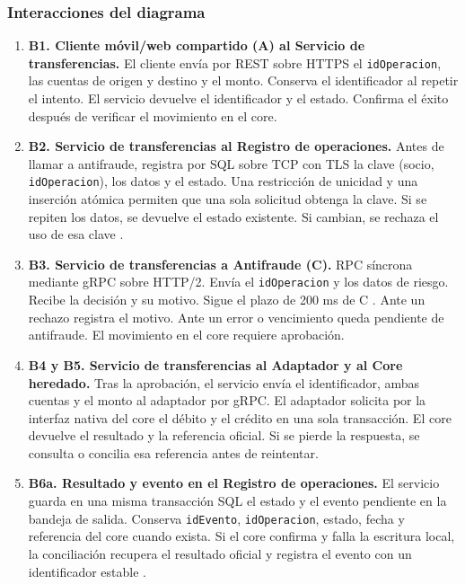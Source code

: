 \documentclass[12pt,a4paper]{article}
\begin{document}
\subsubsection{Interacciones del diagrama}

\begin{enumerate}
    \item \textbf{B1. Cliente móvil/web compartido (A) al Servicio de transferencias.}
    El cliente envía por REST sobre HTTPS el \texttt{idOperacion}, las cuentas de origen y destino y el monto. Conserva el identificador al repetir el intento. El servicio devuelve el identificador y el estado. Confirma el éxito después de verificar el movimiento en el core.

    \item \textbf{B2. Servicio de transferencias al Registro de operaciones.}
    Antes de llamar a antifraude, registra por SQL sobre TCP con TLS la clave (socio, \texttt{idOperacion}), los datos y el estado. Una restricción de unicidad y una inserción atómica permiten que una sola solicitud obtenga la clave. Si se repiten los datos, se devuelve el estado existente. Si cambian, se rechaza el uso de esa clave \cite{featonbyretries}.

    \item \textbf{B3. Servicio de transferencias a Antifraude (C).}
    RPC síncrona mediante gRPC sobre HTTP/2. Envía el \texttt{idOperacion} y los datos de riesgo. Recibe la decisión y su motivo. Sigue el plazo de 200 ms de C \cite{grpcdeadlines}. Ante un rechazo registra el motivo. Ante un error o vencimiento queda pendiente de antifraude. El movimiento en el core requiere aprobación.

    \item \textbf{B4 y B5. Servicio de transferencias al Adaptador y al Core heredado.}
    Tras la aprobación, el servicio envía el identificador, ambas cuentas y el monto al adaptador por gRPC. El adaptador solicita por la interfaz nativa del core el débito y el crédito en una sola transacción. El core devuelve el resultado y la referencia oficial. Si se pierde la respuesta, se consulta o concilia esa referencia antes de reintentar.

    \item \textbf{B6a. Resultado y evento en el Registro de operaciones.}
    El servicio guarda en una misma transacción SQL el estado y el evento pendiente en la bandeja de salida. Conserva \texttt{idEvento}, \texttt{idOperacion}, estado, fecha y referencia del core cuando exista. Si el core confirma y falla la escritura local, la conciliación recupera el resultado oficial y registra el evento con un identificador estable \cite{awsoutbox}.


\end{enumerate}
\end{document}
